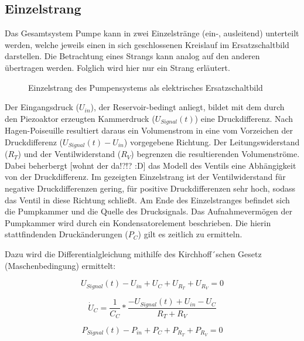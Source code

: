 \documentclass[fontsize=12pt, a4paper]{scrartcl}
\begin{document}
\subsection{Einzelstrang}

Das Gesamtsystem Pumpe kann in zwei Einzelstränge (ein-, ausleitend) unterteilt werden, welche jeweils einen in sich geschlossenen Kreislauf im Ersatzschaltbild darstellen.
Die Betrachtung eines Strangs kann analog auf den anderen übertragen werden. Folglich wird hier nur ein Strang erläutert.

\begin{figure}[H]
	
	\caption{Einzelstrang des Pumpensystems als elektrisches Ersatzschaltbild}
	\label{singlebranch}
\end{figure}

Der Eingangsdruck ($U_{in}$), der Reservoir-bedingt anliegt, bildet mit dem durch den Piezoaktor erzeugten Kammerdruck ($U_{Signal}(t)$) eine Druckdifferenz. Nach Hagen-Poiseuille resultiert daraus ein Volumenstrom in eine vom Vorzeichen der Druckdifferenz ($U_{Signal}(t)-U_{in}$) vorgegebene Richtung. Der Leitungswiderstand ($R_{T}$) und der Ventilwiderstand ($R_{V}$) begrenzen die resultierenden Volumenströme. Dabei beherbergt [wohnt der da!?!? :D] das Modell des Ventils eine Abhängigkeit von der Druckdifferenz. Im gezeigten Einzelstrang ist der Ventilwiderstand für negative Druckdifferenzen gering, für positive Druckdifferenzen sehr hoch, sodass das Ventil in diese Richtung schließt. Am Ende des Einzelstranges befindet sich die Pumpkammer und die Quelle des Drucksignals. Das Aufnahmevermögen der Pumpkammer wird durch ein Kondensatorelement beschrieben. Die hierin stattfindenden Druckänderungen ($P_{C}$) gilt es zeitlich zu ermitteln.

Dazu wird die Differentialgleichung mithilfe des Kirchhoff´schen Gesetz (Maschenbedingung) ermittelt:

\begin{equation}
	U_{Signal}(t) - U_{in} + U_{C} + U_{R_{T}} + U_{R_{V}} = 0
\end{equation}

\begin{equation}
	\dot{U}_{C} = \frac{1}{C_{C}} * \frac{-U_{Signal}(t)+U_{in}-U_{C}}{R_{T}+R_{V}}
\end{equation}

\begin{equation}
	P_{Signal}(t) - P_{in} + P_{C} + P_{R_{T}} + P_{R_{V}} = 0
\end{equation}
\end{document}
